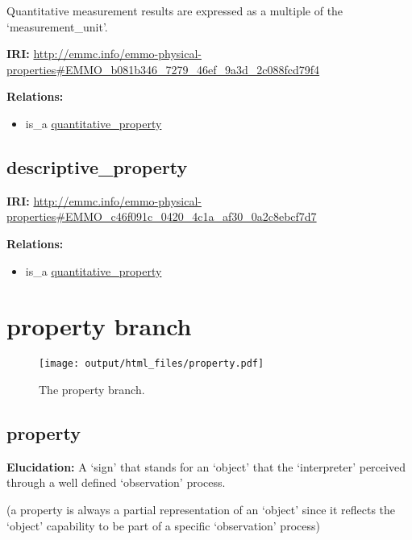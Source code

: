 \documentclass[a4paper,]{report}
\providecommand{\tightlist}{%
  \setlength{\itemsep}{0pt}\setlength{\parskip}{0pt}}
\begin{document}
Quantitative measurement results are expressed as a multiple of the
`measurement\_unit'.

\textbf{IRI:}
\url{http://emmc.info/emmo-physical-properties\#EMMO_b081b346_7279_46ef_9a3d_2c088fcd79f4}

\textbf{Relations:}

\begin{itemize}
\tightlist
\item
  is\_a
  \protect\hyperlink{quantitative_property}{quantitative\_property}
\end{itemize}

\hypertarget{descriptive_property}{%
\subsection{descriptive\_property}\label{descriptive_property}}

\textbf{IRI:}
\url{http://emmc.info/emmo-physical-properties\#EMMO_c46f091c_0420_4c1a_af30_0a2c8ebcf7d7}

\textbf{Relations:}

\begin{itemize}
\tightlist
\item
  is\_a
  \protect\hyperlink{quantitative_property}{quantitative\_property}
\end{itemize}

\hypertarget{property-branch}{%
\section{property branch}\label{property-branch}}

\begin{figure}
\centering
\texttt{[image: output/html\_files/property.pdf]}
\caption{The property branch.}
\end{figure}

\hypertarget{property}{%
\subsection{property}\label{property}}

\textbf{Elucidation:} A `sign' that stands for an `object' that the
`interpreter' perceived through a well defined `observation' process.

(a property is always a partial representation of an `object' since it
reflects the `object' capability to be part of a specific `observation'
process)
\end{document}

